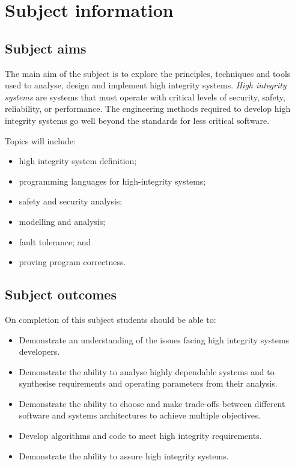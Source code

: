 \section{Subject information}

\subsection*{Subject aims}

The main aim of the subject is to explore the principles, techniques and tools used to analyse, design and implement high integrity systems.
\emph{High integrity systems} are systems that must operate with critical levels of security, safety, reliability, or performance.  The engineering methods required to develop high integrity systems go well beyond the standards for less critical software.

Topics will include:

\begin{itemize}
 \item high integrity system definition;
 \item programming languages for high-integrity systems;
 \item safety and security analysis;
 \item modelling and analysis;
 \item fault tolerance; and
 \item proving program correctness.
\end{itemize}

\subsection*{Subject outcomes}

On completion of this subject students should be able to:

\begin{itemize}

 \item Demonstrate an understanding of the issues facing high    integrity systems developers.

 \item Demonstrate the ability to analyse highly dependable systems and to synthesise    requirements and operating parameters from their analysis.

 \item Demonstrate the ability to choose and make trade-offs between    different software and systems architectures to achieve multiple    objectives.

 \item Develop algorithms and code to meet high integrity    requirements.

  \item Demonstrate the ability to assure high integrity systems.
\end{itemize}


